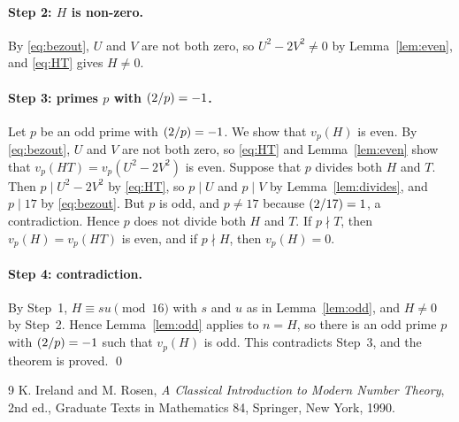 \documentclass[11pt]{article}
\newcommand{\leg}[2]{\mathchoice{\biggl(\dfrac{#1}{#2}\biggr)}{(#1/#2)}{(#1/#2)}{(#1/#2)}}
\begin{document}
\paragraph{Step 2: $H$ is non-zero.} By \eqref{eq:bezout}, $U$ and $V$ are not both zero, so $U^2-2V^2\neq0$ by Lemma~\ref{lem:even}, and \eqref{eq:HT} gives $H\neq0$.

\paragraph{\texorpdfstring{Step 3: primes $p$ with $\leg{2}{p}=-1$.}{Step 3: inert primes.}} Let $p$ be an odd prime with $\leg{2}{p}=-1$. We show that $v_p(H)$ is even. By \eqref{eq:bezout}, $U$ and $V$ are not both zero, so \eqref{eq:HT} and Lemma~\ref{lem:even} show that $v_p(HT)=v_p(U^2-2V^2)$ is even. Suppose that $p$ divides both $H$ and $T$. Then $p\mid U^2-2V^2$ by \eqref{eq:HT}, so $p\mid U$ and $p\mid V$ by Lemma~\ref{lem:divides}, and $p\mid 17$ by \eqref{eq:bezout}. But $p$ is odd, and $p\neq17$ because $\leg{2}{17}=1$, a contradiction. Hence $p$ does not divide both $H$ and $T$. If $p\nmid T$, then $v_p(H)=v_p(HT)$ is even, and if $p\nmid H$, then $v_p(H)=0$.

\paragraph{Step 4: contradiction.} By Step~1, $H\equiv su\pmod{16}$ with $s$ and $u$ as in Lemma~\ref{lem:odd}, and $H\neq0$ by Step~2. Hence Lemma~\ref{lem:odd} applies to $n=H$, so there is an odd prime $p$ with $\leg{2}{p}=-1$ such that $v_p(H)$ is odd. This contradicts Step~3, and the theorem is proved.
\qed

\begin{thebibliography}{9}
 K. Ireland and M. Rosen, \emph{A Classical Introduction to Modern Number Theory}, 2nd ed., Graduate Texts in Mathematics 84, Springer, New York, 1990.
\end{thebibliography}
\end{document}
